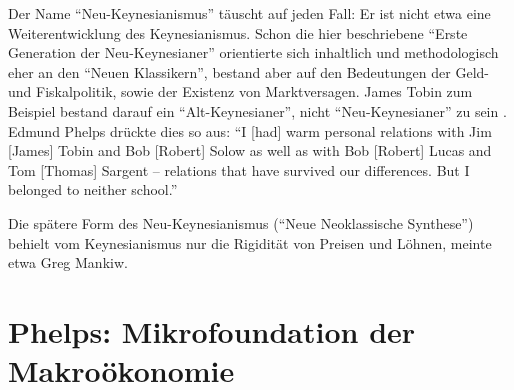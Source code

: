 Der Name "`Neu-Keynesianismus"' täuscht auf jeden Fall: Er ist nicht etwa eine Weiterentwicklung des Keynesianismus. Schon die hier beschriebene "`Erste Generation der Neu-Keynesianer"' orientierte sich inhaltlich und methodologisch eher an den "`Neuen Klassikern"', bestand aber auf den Bedeutungen der Geld- und Fiskalpolitik, sowie der Existenz von Marktversagen. James Tobin zum Beispiel bestand darauf ein "`Alt-Keynesianer"', nicht  "`Neu-Keynesianer"' zu sein \parencite[S. 45ff]{Tobin1993}. 
Edmund Phelps drückte dies so aus: "`I [had] warm personal relations with Jim [James] Tobin and Bob [Robert] Solow as well as with Bob [Robert] Lucas and Tom [Thomas] Sargent – relations that have survived our differences. But I belonged to neither school."'

Die spätere Form des Neu-Keynesianismus ("`Neue Neoklassische Synthese"') behielt vom Keynesianismus nur die Rigidität von Preisen und Löhnen, meinte etwa Greg Mankiw.
 

\section{Phelps: Mikrofoundation der Makroökonomie}
\label{micmac}


